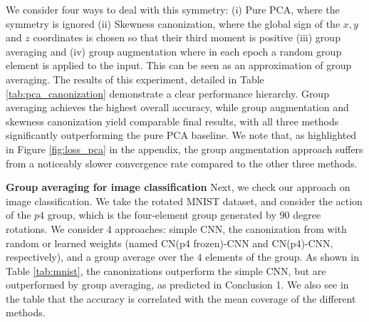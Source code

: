 We consider four ways to deal with this symmetry: (i) Pure PCA, where the symmetry is ignored (ii) Skewness canonization, where the global sign of the $x,y$ and $z$ coordinates is chosen so that their third moment is positive (iii) group averaging and (iv) group augmentation where in each epoch a random group element is applied to the input. This  can be seen as an approximation of group averaging. The results of this experiment, detailed in Table \ref{tab:pca_canonization}  demonstrate a clear performance hierarchy. Group averaging achieves the highest overall accuracy, while group augmentation and skewness canonization yield comparable final results, with all three methods significantly outperforming the pure PCA baseline. We note that, as highlighted in Figure \ref{fig:loss_pca} in the appendix, the group augmentation approach suffers from a noticeably slower convergence rate compared to the other three methods.

\textbf{Group averaging for image classification} Next, we check our approach on image classification. We take the rotated MNIST \cite{larochelle2007empirical} dataset, and consider the action of the $p4$ group, which is the four-element group generated by $90$ degree rotations. We consider 4 approaches: simple CNN, the canonization from \cite{kaba2023equivariance} with random or learned weights (named CN(p4 frozen)-CNN and CN(p4)-CNN, respectively), and a group average over the $4$ elements of the group. As shown in Table \ref{tab:mnist}, the canonizations outperform the simple CNN, but are outperformed by group averaging, as predicted in Conclusion 1. We also see in the table that the accuracy is correlated with the mean coverage of the different methods.

